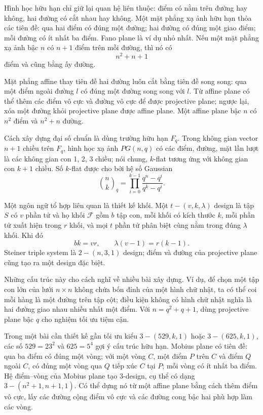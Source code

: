 \documentclass[11pt]{article}
\begin{document}
Hình học hữu hạn chỉ giữ lại quan hệ liên thuộc: điểm có nằm trên đường hay
không, hai đường có cắt nhau hay không. Một mặt phẳng xạ ảnh hữu hạn thỏa các
tiên đề: qua hai điểm có đúng một đường; hai đường có đúng một giao điểm; mỗi
đường có ít nhất ba điểm. Fano plane là ví dụ nhỏ nhất. Nếu một mặt phẳng xạ
ảnh bậc $n$ có $n+1$ điểm trên mỗi đường, thì nó có
\[
  n^2+n+1
\]
điểm và cũng bằng ấy đường.

Mặt phẳng affine thay tiên đề hai đường luôn cắt bằng tiên đề song song: qua
một điểm ngoài đường $l$ có đúng một đường song song với $l$. Từ affine plane có
thể thêm các điểm vô cực và đường vô cực để được projective plane; ngược lại,
xóa một đường khỏi projective plane được affine plane. Một affine plane bậc $n$
có $n^2$ điểm và $n^2+n$ đường.

Cách xây dựng đại số chuẩn là dùng trường hữu hạn $F_q$. Trong không gian vector
$n+1$ chiều trên $F_q$, hình học xạ ảnh $PG(n,q)$ có các điểm, đường, mặt lần
lượt là các không gian con 1, 2, 3 chiều; nói chung, $k$-flat tương ứng với
không gian con $k+1$ chiều. Số $k$-flat được cho bởi hệ số Gaussian
\[
  \binom nk_q=\prod_{i=0}^{k-1}\frac{q^n-q^i}{q^k-q^i}.
\]

Một ngôn ngữ tổ hợp liên quan là thiết kế khối. Một $t-(v,k,\lambda)$ design là
tập $S$ có $v$ phần tử và họ khối $\mathcal F$ gồm $b$ tập con, mỗi khối có
kích thước $k$, mỗi phần tử xuất hiện trong $r$ khối, và mọi $t$ phần tử phân
biệt cùng nằm trong đúng $\lambda$ khối. Khi đó
\[
  bk=vr,\qquad \lambda(v-1)=r(k-1).
\]
Steiner triple system là $2-(n,3,1)$ design; điểm và đường của projective plane
cũng tạo ra một design đặc biệt.

Những cấu trúc này cho cách nghĩ về nhiều bài xây dựng. Ví dụ, để chọn một tập
con lớn của lưới $n\times n$ không chứa bốn đỉnh của một hình chữ nhật, ta có
thể coi mỗi hàng là một đường trên tập cột; điều kiện không có hình chữ nhật
nghĩa là hai đường giao nhau nhiều nhất một điểm. Với $n=q^2+q+1$, dùng
projective plane bậc $q$ cho nghiệm tối ưu tiệm cận.

Trong một bài cần thiết kế gần tối ưu kiểu $3-(529,k,1)$ hoặc $3-(625,k,1)$,
các số $529=23^2$ và $625=5^4$ gợi ý cấu trúc hữu hạn. Mobius plane có tiên đề:
qua ba điểm có đúng một vòng; với một vòng $C$, một điểm $P$ trên $C$ và điểm
$Q$ ngoài $C$, có đúng một vòng qua $Q$ tiếp xúc $C$ tại $P$; mỗi vòng có ít
nhất ba điểm. Hệ điểm--vòng của Mobius plane tạo $3$-design, cụ thể có dạng
$3-(n^2+1,n+1,1)$. Có thể dựng nó từ một affine plane bằng cách thêm điểm vô
cực, lấy các đường cộng điểm vô cực và các đường cong bậc hai phù hợp làm các
vòng.
\end{document}
